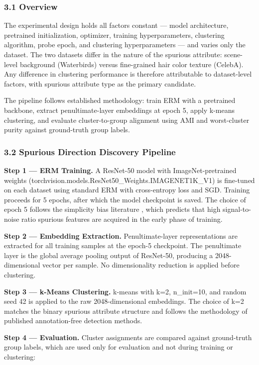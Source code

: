 
\subsubsection{3.1 Overview}

The experimental design holds all factors constant — model architecture, pretrained initialization, optimizer, training hyperparameters, clustering algorithm, probe epoch, and clustering hyperparameters — and varies only the dataset. The two datasets differ in the nature of the spurious attribute: scene-level background (Waterbirds) versus fine-grained hair color texture (CelebA). Any difference in clustering performance is therefore attributable to dataset-level factors, with spurious attribute type as the primary candidate.

The pipeline follows established methodology: train ERM with a pretrained backbone, extract penultimate-layer embeddings at epoch 5, apply k-means clustering, and evaluate cluster-to-group alignment using AMI and worst-cluster purity against ground-truth group labels.

\subsubsection{3.2 Spurious Direction Discovery Pipeline}

\textbf{Step 1 — ERM Training.} A ResNet-50 model with ImageNet-pretrained weights (torchvision.models.ResNet50_Weights.IMAGENET1K_V1) is fine-tuned on each dataset using standard ERM with cross-entropy loss and SGD. Training proceeds for 5 epochs, after which the model checkpoint is saved. The choice of epoch 5 follows the simplicity bias literature \citep{Shahetal2020}, which predicts that high signal-to-noise ratio spurious features are acquired in the early phase of training.

\textbf{Step 2 — Embedding Extraction.} Penultimate-layer representations are extracted for all training samples at the epoch-5 checkpoint. The penultimate layer is the global average pooling output of ResNet-50, producing a 2048-dimensional vector per sample. No dimensionality reduction is applied before clustering.

\textbf{Step 3 — k-Means Clustering.} k-means with k=2, n_init=10, and random seed 42 is applied to the raw 2048-dimensional embeddings. The choice of k=2 matches the binary spurious attribute structure and follows the methodology of published annotation-free detection methods.

\textbf{Step 4 — Evaluation.} Cluster assignments are compared against ground-truth group labels, which are used only for evaluation and not during training or clustering:

